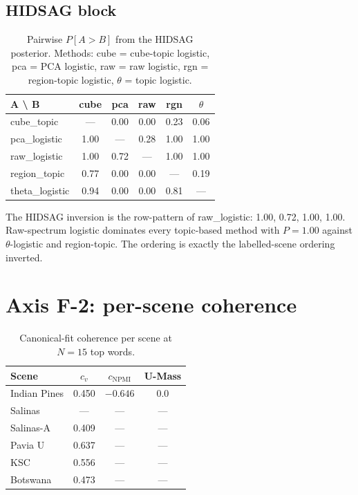 \documentclass[11pt,a4paper]{article}
\begin{document}
\subsection{HIDSAG block}

\begin{table}[h]
\caption{Pairwise $P[A > B]$ from the HIDSAG posterior. Methods:
cube = cube-topic logistic, pca = PCA logistic, raw = raw logistic,
rgn = region-topic logistic, $\theta$ = topic logistic.}
\label{tab:b1-pair-hidsag}
\centering
\small
\begin{tabular}{l c c c c c}
\toprule
A \textbackslash{} B & cube & pca & raw & rgn & $\theta$ \\
\midrule
cube\_topic   & ---   & 0.00 & 0.00 & 0.23 & 0.06 \\
pca\_logistic & 1.00 & ---   & 0.28 & 1.00 & 1.00 \\
raw\_logistic & 1.00 & 0.72 & ---   & 1.00 & 1.00 \\
region\_topic & 0.77 & 0.00 & 0.00 & ---   & 0.19 \\
theta\_logistic & 0.94 & 0.00 & 0.00 & 0.81 & ---   \\
\bottomrule
\end{tabular}
\end{table}

The HIDSAG inversion is the row-pattern of raw\_logistic: 1.00, 0.72,
1.00, 1.00. Raw-spectrum logistic dominates every topic-based method
with $P = 1.00$ against $\theta$-logistic and region-topic. The
ordering is exactly the labelled-scene ordering inverted.

\section{Axis F-2: per-scene coherence}

\begin{table}[h]
\caption{Canonical-fit coherence per scene at $N = 15$ top words.}
\label{tab:b2}
\centering
\small
\begin{tabular}{l c c c}
\toprule
Scene            & $c_v$ & $c_{\text{NPMI}}$ & U-Mass \\
\midrule
Indian Pines     & 0.450 & $-0.646$ & 0.0 \\
Salinas          & ---    & ---       & --- \\
Salinas-A        & 0.409 & ---       & --- \\
Pavia U          & 0.637 & ---       & --- \\
KSC              & 0.556 & ---       & --- \\
Botswana         & 0.473 & ---       & --- \\
\bottomrule
\end{tabular}
\end{table}
\end{document}
